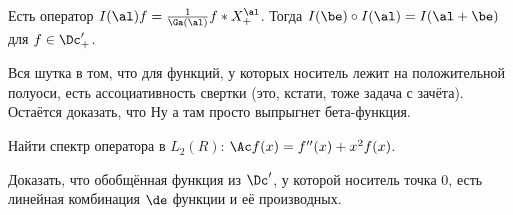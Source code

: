 \documentclass[a4paper]{article}
\begin{document}
\begin{problem}
Есть оператор $I(\al) f= \frac{1}{\Ga(\al)} f*X_+^\al$. Тогда $I(\be)\circ I(\al) = I(\al+\be)$ для $f\in \Dc'_+$.
\end{problem}
\begin{hint}
Вся шутка в том, что для функций, у которых носитель лежит на положительной полуоси, есть ассоциативность
свертки (это, кстати, тоже задача с зачёта). Остаётся доказать, что
 Ну а там просто выпрыгнет бета-функция.
\end{hint}

\begin{problem}
Найти спектр оператора в $L_2(R)$: $\Ac f(x) = f''(x)+x^2 f(x)$.
\end{problem}

\begin{problem}
Доказать, что обобщённая функция из $\Dc'$, у которой носитель точка $0$, есть линейная комбинация $\de$
функции и её производных.
\end{problem}

\medskip
\dmvntrail
\end{document}
